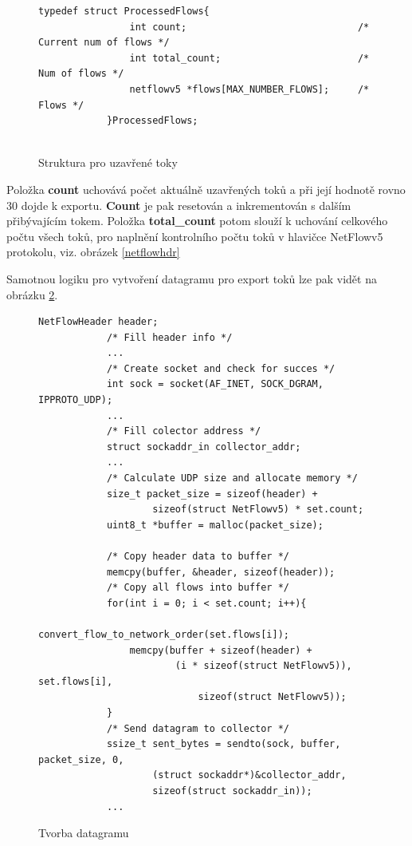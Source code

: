\documentclass[11pt, a4paper, hidelinks]{article}[08.10.2023]
\begin{document}
     \begin{figure}[h!]
        \centering
        \begin{lstlisting}[style=CStyle]
            typedef struct ProcessedFlows{
                int count;                              /* Current num of flows */
                int total_count;                        /* Num of flows */
                netflowv5 *flows[MAX_NUMBER_FLOWS];     /* Flows */
            }ProcessedFlows;
            
        \end{lstlisting}
        \caption{Struktura pro uzavřené toky}
        \label{set}
    \end{figure}

    Položka \textbf{count} uchovává počet aktuálně uzavřených toků a při její hodnotě rovno 30 dojde k exportu. \textbf{Count} je pak resetován a inkrementován s dalším přibývajícím tokem. Položka \textbf{total\_count} potom slouží k uchování celkového počtu všech toků, pro naplnění kontrolního počtu toků v hlavičce NetFlowv5 protokolu, viz. obrázek \ref{netflowhdr}

    Samotnou logiku pro vytvoření datagramu pro export toků lze pak vidět na obrázku \ref{export_udp}.
         \begin{figure}[ht]
        \centering
        \begin{lstlisting}[style=CStyle]
            NetFlowHeader header;
            /* Fill header info */
            ...
            /* Create socket and check for succes */
            int sock = socket(AF_INET, SOCK_DGRAM, IPPROTO_UDP);
            ...
            /* Fill colector address */
            struct sockaddr_in collector_addr;
            ...
            /* Calculate UDP size and allocate memory */
            size_t packet_size = sizeof(header) + 
                    sizeof(struct NetFlowv5) * set.count;
            uint8_t *buffer = malloc(packet_size);

            /* Copy header data to buffer */
            memcpy(buffer, &header, sizeof(header));
            /* Copy all flows into buffer */
            for(int i = 0; i < set.count; i++){
                convert_flow_to_network_order(set.flows[i]);
                memcpy(buffer + sizeof(header) + 
                        (i * sizeof(struct NetFlowv5)), set.flows[i], 
                            sizeof(struct NetFlowv5));
            }
            /* Send datagram to collector */
            ssize_t sent_bytes = sendto(sock, buffer, packet_size, 0, 
                    (struct sockaddr*)&collector_addr, 
                    sizeof(struct sockaddr_in));
            ...
        \end{lstlisting}
        \caption{Tvorba datagramu}
        \label{export_udp}
    \end{figure}
\end{document}
